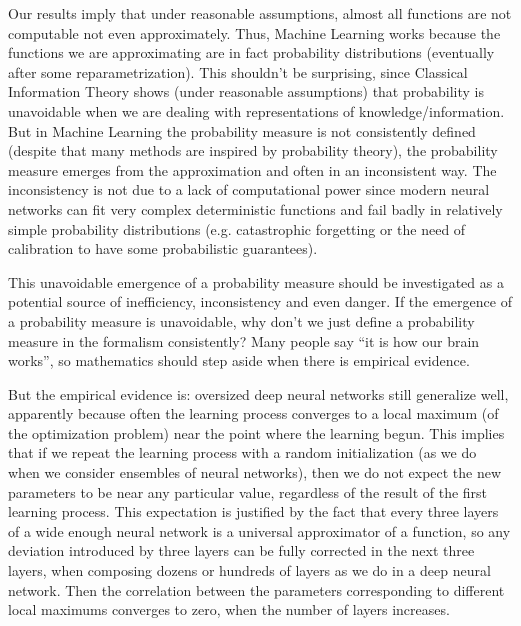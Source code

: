 \documentclass[11pt,a4paper]{report}
\begin{document}
Our results imply that under reasonable assumptions, almost all
functions are not computable not even approximately. Thus, Machine
Learning works because the functions we are approximating are in fact
probability distributions (eventually after some
reparametrization\cite{anonymous2023value-probability}). This shouldn't be surprising, since Classical Information
Theory shows (under reasonable assumptions) that probability is
unavoidable when we are dealing with representations of
knowledge/information\cite{novak2008tractability}\cite{hennig2022probabilistic}. But in Machine Learning the probability measure is
not consistently defined (despite that many methods are inspired by
probability theory), the probability measure emerges from the
approximation\cite{anonymous2023value-probability} and often in an inconsistent way. The inconsistency is not due to
a lack of computational power since modern neural networks can fit very
complex deterministic functions and fail
badly\cite{lakshminarayanan2017simple}\cite{degrancey:hal-03769683} in relatively simple probability distributions (e.g. catastrophic
forgetting or the need of calibration to have some probabilistic
guarantees\cite{degrancey:hal-03769683}).

This unavoidable emergence of a probability measure should be
investigated as a potential source of inefficiency, inconsistency and
even danger. If the emergence of a probability measure is unavoidable,
why don't we just define a probability measure in the formalism
consistently? Many people say ``it is how our brain works'', so
mathematics should step aside when there is empirical evidence.

But the empirical evidence is: oversized deep neural networks still
generalize well, apparently because often the learning process converges
to a local maximum (of the optimization problem) near the point where
the learning begun\cite{li2018learning}. This implies that if we repeat the learning process with a
random initialization (as we do when we consider ensembles of neural
networks\cite{lakshminarayanan2017simple}\cite{egele2022autodeuq}),
then we do not expect the new parameters to be near any particular
value, regardless of the result of the first learning process. This
expectation is justified by the fact that every three layers of a wide
enough neural network is a universal approximator of a
function\cite{hornik1989multilayer}, so any deviation introduced by three
layers can be fully corrected in the next three layers, when composing
dozens or hundreds of layers as we do in a deep neural network. Then the
correlation between the parameters corresponding to different local
maximums converges to zero, when the number of layers increases.
\end{document}

